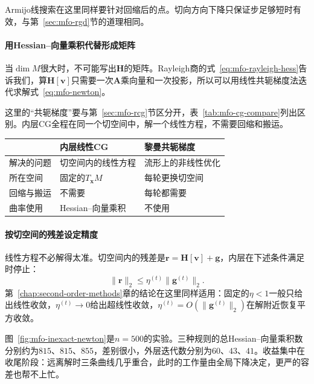 Armijo线搜索在这里同样要针对回缩后的点。切向方向下降只保证步足够短时有效，与第~\ref{sec:mfo-rgd}节的道理相同。

\paragraph{用Hessian--向量乘积代替形成矩阵}
当$\dim M$很大时，不可能写出$\bm{H}$的矩阵。Rayleigh商的式~\eqref{eq:mfo-rayleigh-hess}告诉我们，算$\bm{H}[\bm{v}]$只需要一次$\bm{A}$乘向量和一次投影，所以可以用线性共轭梯度法迭代求解式~\eqref{eq:mfo-newton}。

这里的“共轭梯度”要与第~\ref{sec:mfo-rcg}节区分开，表~\ref{tab:mfo-cg-compare}列出区别。内层CG全程在同一个切空间中，解一个线性方程，不需要回缩和搬运。

\begin{BookInlineTable}
 \centering
 \caption{两种共轭梯度。}
 \label{tab:mfo-cg-compare}
 \begin{tabular}{lll}
  \toprule
  & 内层线性CG & 黎曼共轭梯度\\
  \midrule
  解决的问题 & 切空间内的线性方程 & 流形上的非线性优化\\
  所在空间 & 固定的$T_{\bm{x}}M$ & 每轮更换切空间\\
  回缩与搬运 & 不需要 & 每轮都需要\\
  曲率使用 & Hessian--向量乘积 & 不使用\\
  \bottomrule
 \end{tabular}
\end{BookInlineTable}

\paragraph{按切空间的残差设定精度}
线性方程不必解得太准。切空间内的残差是$\bm{r}=\bm{H}[\bm{v}]+\bm{g}$，内层在下述条件满足时停止：
\begin{equation}
 \lVert\bm{r}\rVert_2\leq\eta^{(t)}\lVert\bm{g}^{(t)}\rVert_2.
 \label{eq:mfo-forcing}
\end{equation}
第~\ref{chap:second-order-methods}章的结论在这里同样适用：固定的$\eta<1$一般只给出线性收敛，$\eta^{(t)}\to0$给出超线性收敛，$\eta^{(t)}=O(\lVert\bm{g}^{(t)}\rVert_2)$在解附近恢复平方收敛。

图~\ref{fig:mfo-inexact-newton}是$n=500$的实验。三种规则的总Hessian--向量乘积数分别约为$815$、$815$、$855$，差别很小，外层迭代数分别为$60$、$43$、$41$。收益集中在收尾阶段：远离解时三条曲线几乎重合，此时的工作量由全局下降决定，更严的容差也帮不上忙。

